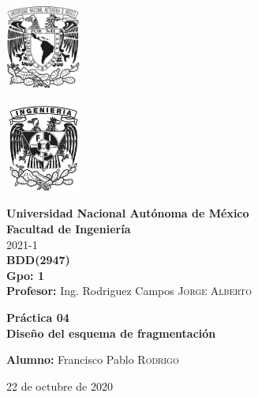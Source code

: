 \documentclass{article}
\newcommand{\materia}{BDD}
\newcommand{\clave}{2947}
\newcommand{\profesor}{Ing. Rodriguez Campos \textsc{Jorge Alberto}}
\newcommand{\semestre}{2021-1}
\newcommand{\alumno}{Francisco Pablo \textsc{Rodrigo}}
\newcommand{\actividad}{Práctica 04}
\newcommand{\titulo}{Diseño del esquema de fragmentación}
\newcommand{\fechaEntrega}{22 de octubre de 2020}
\begin{document}
\thispagestyle{empty}
\begin{minipage}[t][5cm][t]{0.2\linewidth}
    \includegraphics[width=2.5cm]{unam.jpg}
    \vspace{10cm}

    \includegraphics[width=2.5cm]{fiblack}
\end{minipage}
\begin{minipage}[t]{0.7\linewidth}
    \vspace{-2.5cm}
    \LARGE{\textbf{Universidad Nacional Autónoma de México}}\\
    \Large{\textbf{Facultad de Ingeniería}} \\

    \large{\semestre}\\[2cm]

    \large{\textbf{\materia (\clave)}}\\
    \large{\textbf{Gpo: 1}}\\[5mm]
    \large{\textbf{Profesor:} \profesor}\\ [1.5cm]
    \begin{center}
        \LARGE{\textbf{\actividad}}\\
        \LARGE{\textbf{\titulo}}\\
    \end{center}

    \vspace{3.3cm}

    \large{\textbf{Alumno:} \alumno} \\[1.5cm]

    \begin{flushright}
        \fechaEntrega%
    \end{flushright}
\end{minipage}

\newpage
\end{document}

